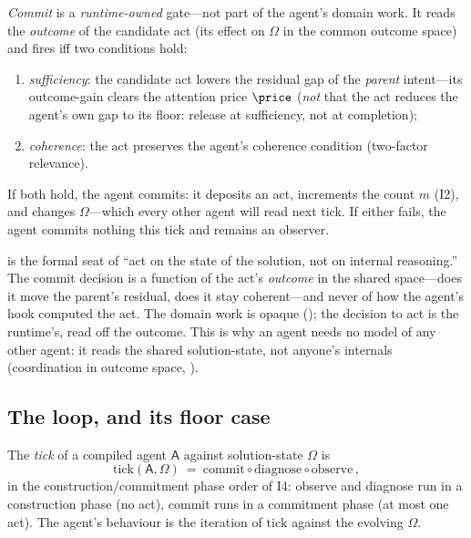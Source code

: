 \documentclass[11pt,twocolumn,a4paper]{article}
\newcommand{\Agent}{\mathsf{A}}
\begin{document}
\begin{definition}
\label{def:step-commit}
\emph{Commit} is a \emph{runtime-owned} gate---not part of the agent's domain
work. It reads the \emph{outcome} of the candidate act (its effect on
$\Omega$ in the common outcome space) and fires iff two conditions hold:
\begin{enumerate}[label=\textup{(\roman*)},leftmargin=2.2em]
\item \emph{sufficiency}: the candidate act lowers the residual gap of the
\emph{parent} intent---its outcome-gain clears the attention price $\price$
(\emph{not} that the act reduces the agent's own gap to its floor: release at
sufficiency, not at completion);
\item \emph{coherence}: the act preserves the agent's coherence condition
(two-factor relevance).
\end{enumerate}
If both hold, the agent commits: it deposits an act, increments the count
$m$ (I2), and changes $\Omega$---which every other agent will read next tick.
If either fails, the agent commits nothing this tick and remains an observer.
\end{definition}

\begin{remark}
\label{rem:gate-outcome}
 is the formal seat of ``act on the state of the
solution, not on internal reasoning.'' The commit decision is a function of
the act's \emph{outcome} in the shared space---does it move the parent's
residual, does it stay coherent---and never of how the agent's hook computed
the act. The domain work is opaque (); the decision to act
is the runtime's, read off the outcome. This is why an agent needs no model of
any other agent: it reads the shared solution-state, not anyone's internals
(coordination in outcome space, ).
\end{remark}

\subsection{The loop, and its floor case}

\begin{definition}
\label{def:tick}
The \emph{tick} of a compiled agent $\Agent$ against solution-state $\Omega$
is
\[
\mathrm{tick}(\Agent,\Omega)\ =\ \mathrm{commit}\circ\mathrm{diagnose}\circ
\mathrm{observe}\,,
\]
in the construction/commitment phase order of I4: observe and diagnose run in
a construction phase (no act), commit runs in a commitment phase (at most one
act). The agent's behaviour is the iteration of $\mathrm{tick}$ against the
evolving $\Omega$.
\end{definition}
\end{document}
